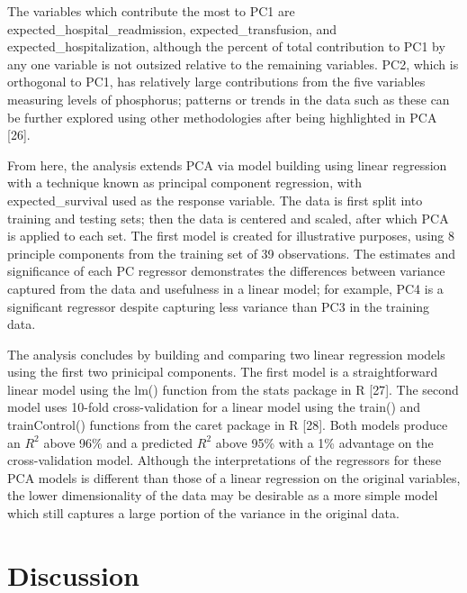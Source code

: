 \documentclass[
  letterpaper,
  DIV=11,
  numbers=noendperiod]{scrreprt}
\begin{document}
The variables which contribute the most to PC1 are
expected\_hospital\_readmission, expected\_transfusion, and
expected\_hospitalization, although the percent of total contribution to
PC1 by any one variable is not outsized relative to the remaining
variables. PC2, which is orthogonal to PC1, has relatively large
contributions from the five variables measuring levels of phosphorus;
patterns or trends in the data such as these can be further explored
using other methodologies after being highlighted in PCA {[}26{]}.

From here, the analysis extends PCA via model building using linear
regression with a technique known as principal component regression,
with expected\_survival used as the response variable. The data is first
split into training and testing sets; then the data is centered and
scaled, after which PCA is applied to each set. The first model is
created for illustrative purposes, using 8 principle components from the
training set of 39 observations. The estimates and significance of each
PC regressor demonstrates the differences between variance captured from
the data and usefulness in a linear model; for example, PC4 is a
significant regressor despite capturing less variance than PC3 in the
training data.

The analysis concludes by building and comparing two linear regression
models using the first two prinicipal components. The first model is a
straightforward linear model using the lm() function from the stats
package in R {[}27{]}. The second model uses 10-fold cross-validation
for a linear model using the train() and trainControl() functions from
the caret package in R {[}28{]}. Both models produce an \(R^2\) above
96\% and a predicted \(R^2\) above 95\% with a 1\% advantage on the
cross-validation model. Although the interpretations of the regressors
for these PCA models is different than those of a linear regression on
the original variables, the lower dimensionality of the data may be
desirable as a more simple model which still captures a large portion of
the variance in the original data.


\hypertarget{discussion}{%
\chapter{Discussion}\label{discussion}}
\end{document}
